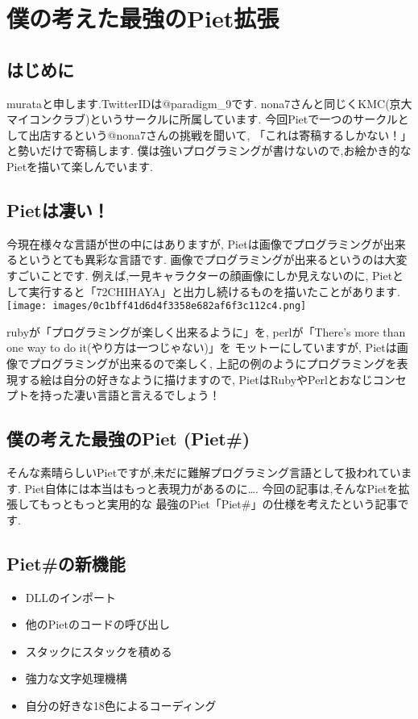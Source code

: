 \chapter{僕の考えた最強のPiet拡張}

\section{はじめに}

murataと申します.TwitterIDは@paradigm\_9です.
nona7さんと同じくKMC(京大マイコンクラブ)というサークルに所属しています.
今回Pietで一つのサークルとして出店するという@nona7さんの挑戦を聞いて,
「これは寄稿するしかない！」と勢いだけで寄稿します.
僕は強いプログラミングが書けないので,お絵かき的なPietを描いて楽しんでいます.

\section{Pietは凄い！}

今現在様々な言語が世の中にはありますが,
Pietは画像でプログラミングが出来るというとても異彩な言語です.
画像でプログラミングが出来るというのは大変すごいことです.
例えば,一見キャラクターの顔画像にしか見えないのに,
Pietとして実行すると「72CHIHAYA」と出力し続けるものを描いたことがあります.\\\texttt{[image: images/0c1bff41d6d4f3358e682af6f3c112c4.png]}

rubyが「プログラミングが楽しく出来るように」を, perlが「There's more
than one way to do it(やり方は一つじゃない)」を モットーにしていますが,
Pietは画像でプログラミングが出来るので楽しく,
上記の例のようにプログラミングを表現する絵は自分の好きなように描けますので,
PietはRubyやPerlとおなじコンセプトを持った凄い言語と言えるでしょう！

\section{僕の考えた最強のPiet (Piet\#)}

そんな素晴らしいPietですが,未だに難解プログラミング言語として扱われています.
Piet自体には本当はもっと表現力があるのに\ldots{}.
今回の記事は,そんなPietを拡張してもっともっと実用的な
最強のPiet「Piet\#」の仕様を考えたという記事です.

\section{Piet\#の新機能}

\begin{itemize}
\item
  DLLのインポート
\item
  他のPietのコードの呼び出し
\item
  スタックにスタックを積める
\item
  強力な文字処理機構
\item
  自分の好きな18色によるコーディング
\end{itemize}

